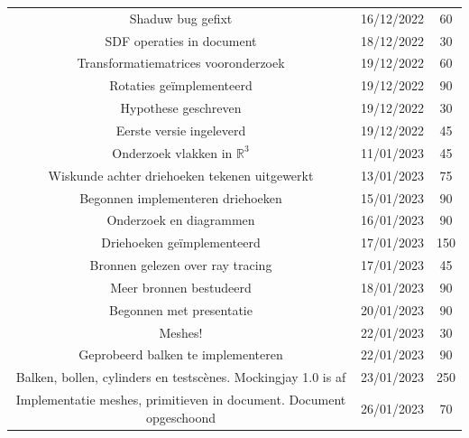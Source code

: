 \documentclass[12pt, a4paper]{article}
\begin{document}
\begin{table}[!htp]
{\begin{tabular}{| c c c |}
			Shaduw bug gefixt                                                    & 16/12/2022 & 60             \\
			SDF operaties in document                                            & 18/12/2022 & 30             \\
			Transformatiematrices vooronderzoek                                  & 19/12/2022 & 60             \\
			Rotaties geïmplementeerd                                             & 19/12/2022 & 90             \\
			Hypothese geschreven                                                 & 19/12/2022 & 30             \\
			Eerste versie ingeleverd                                             & 19/12/2022 & 45             \\
			Onderzoek vlakken in $\mathbb{R}^3$                                  & 11/01/2023 & 45             \\
			Wiskunde achter driehoeken tekenen uitgewerkt                        & 13/01/2023 & 75             \\
			Begonnen implementeren driehoeken                                    & 15/01/2023 & 90             \\
			Onderzoek en diagrammen                                              & 16/01/2023 & 90             \\
			Driehoeken geïmplementeerd                                           & 17/01/2023 & 150            \\
			Bronnen gelezen over ray tracing                                     & 17/01/2023 & 45             \\
			Meer bronnen bestudeerd                                              & 18/01/2023 & 90             \\
			Begonnen met presentatie                                             & 20/01/2023 & 90             \\
			Meshes!                                                              & 22/01/2023 & 30             \\
			Geprobeerd balken te implementeren                                   & 22/01/2023 & 90             \\
			Balken, bollen, cylinders en testscènes. Mockingjay 1.0 is af        & 23/01/2023 & 250            \\
			Implementatie meshes, primitieven in document. Document opgeschoond  & 26/01/2023 & 70             \\

\end{tabular}}
\end{table}
\end{document}
